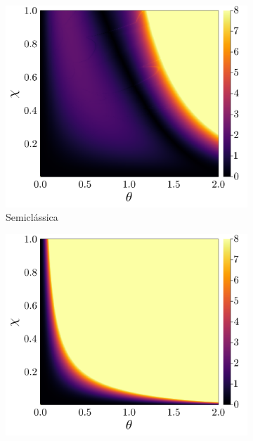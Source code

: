 \documentclass[
	12pt,
	oneside,			%
	a4paper,			%
	english,			%
	brazil				%
	]{abntex2}
\theoremstyle{definition}
\begin{document}
\begin{figure}[H]
     \centering
     \begin{subfigure}[b]{0.32\textwidth}
         \centering
         \includegraphics[width=\textwidth]{Imagens/erro_relativo_calor_kerr_sc.png}
         \caption{Semiclássica}
         \label{erro relativo calor kerr sc}
     \end{subfigure}
     \hfill
     \begin{subfigure}[b]{0.32\textwidth}
         \centering
         \includegraphics[width=\textwidth]{Imagens/erro_relativo_calor_kerr_dm.png}

\end{subfigure}
\end{figure}
\end{document}
